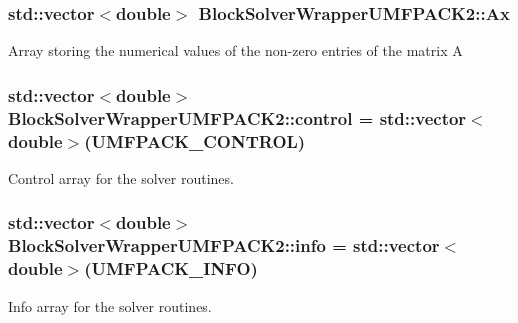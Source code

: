 \subsubsection[{\texorpdfstring{Ax}{Ax}}]{\setlength{\rightskip}{0pt plus 5cm}std\+::vector$<$double$>$ Block\+Solver\+Wrapper\+U\+M\+F\+P\+A\+C\+K2\+::\+Ax\hspace{0.3cm}{\ttfamily [private]}}\hypertarget{class_block_solver_wrapper_u_m_f_p_a_c_k2_a57a4f7722dbbdd1ec2efa416f1cbb47c}{}\label{class_block_solver_wrapper_u_m_f_p_a_c_k2_a57a4f7722dbbdd1ec2efa416f1cbb47c}
Array storing the numerical values of the non-\/zero entries of the matrix A 
\subsubsection[{\texorpdfstring{control}{control}}]{\setlength{\rightskip}{0pt plus 5cm}std\+::vector$<$double$>$ Block\+Solver\+Wrapper\+U\+M\+F\+P\+A\+C\+K2\+::control = std\+::vector$<$double$>$(U\+M\+F\+P\+A\+C\+K\+\_\+\+C\+O\+N\+T\+R\+OL)\hspace{0.3cm}{\ttfamily [private]}}\hypertarget{class_block_solver_wrapper_u_m_f_p_a_c_k2_a295fca0b28991ae43c7bdfb72b5cdcb2}{}\label{class_block_solver_wrapper_u_m_f_p_a_c_k2_a295fca0b28991ae43c7bdfb72b5cdcb2}
Control array for the solver routines. 
\subsubsection[{\texorpdfstring{info}{info}}]{\setlength{\rightskip}{0pt plus 5cm}std\+::vector$<$double$>$ Block\+Solver\+Wrapper\+U\+M\+F\+P\+A\+C\+K2\+::info = std\+::vector$<$double$>$(U\+M\+F\+P\+A\+C\+K\+\_\+\+I\+N\+FO)\hspace{0.3cm}{\ttfamily [private]}}\hypertarget{class_block_solver_wrapper_u_m_f_p_a_c_k2_a8dfbe8f5e1f1cf26460ba584b4eb02b6}{}\label{class_block_solver_wrapper_u_m_f_p_a_c_k2_a8dfbe8f5e1f1cf26460ba584b4eb02b6}
Info array for the solver routines. 
